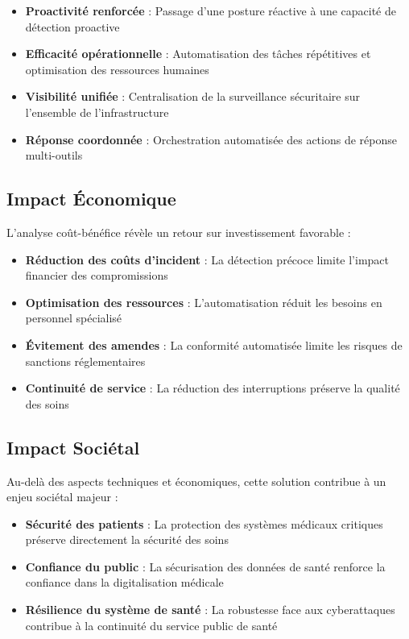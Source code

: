 \begin{itemize}
    \item \textbf{Proactivité renforcée} : Passage d'une posture réactive à une capacité de détection proactive
    \item \textbf{Efficacité opérationnelle} : Automatisation des tâches répétitives et optimisation des ressources humaines
    \item \textbf{Visibilité unifiée} : Centralisation de la surveillance sécuritaire sur l'ensemble de l'infrastructure
    \item \textbf{Réponse coordonnée} : Orchestration automatisée des actions de réponse multi-outils
\end{itemize}

\subsection{Impact Économique}

L'analyse coût-bénéfice révèle un retour sur investissement favorable :

\begin{itemize}
    \item \textbf{Réduction des coûts d'incident} : La détection précoce limite l'impact financier des compromissions
    \item \textbf{Optimisation des ressources} : L'automatisation réduit les besoins en personnel spécialisé
    \item \textbf{Évitement des amendes} : La conformité automatisée limite les risques de sanctions réglementaires
    \item \textbf{Continuité de service} : La réduction des interruptions préserve la qualité des soins
\end{itemize}

\subsection{Impact Sociétal}

Au-delà des aspects techniques et économiques, cette solution contribue à un enjeu sociétal majeur :

\begin{itemize}
    \item \textbf{Sécurité des patients} : La protection des systèmes médicaux critiques préserve directement la sécurité des soins
    \item \textbf{Confiance du public} : La sécurisation des données de santé renforce la confiance dans la digitalisation médicale
    \item \textbf{Résilience du système de santé} : La robustesse face aux cyberattaques contribue à la continuité du service public de santé
\end{itemize}

